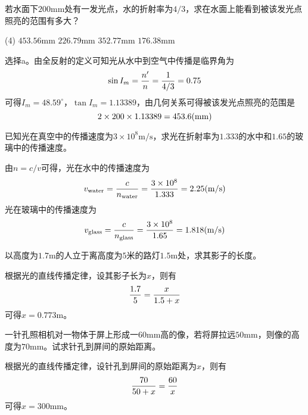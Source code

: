 \documentclass[cn,10pt,chinesefont=founder,math=newtx,cite=super,twoside]{elegantbook}
\begin{document}
\begin{problem}
	若水面下$200\mathrm{mm}$处有一发光点，水的折射率为$4/3$，求在水面上能看到被该发光点照亮的范围有多大？
	\begin{tasks}(4)
		\task $453.56\mathrm{mm}$
		\task $226.79\mathrm{mm}$
		\task $352.77\mathrm{mm}$
		\task $176.38\mathrm{mm}$
	\end{tasks}
\end{problem}
\begin{solution}
	选择a。由全反射的定义可知光从水中到空气中传播是临界角为
	\begin{equation}
	\sin I_m=\frac{n'}{n}=\frac{1}{4/3}=0.75\notag
	\end{equation}
	可得$I_m=48.59^{\circ}$，$\tan I_m=1.13389$，由几何关系可得被该发光点照亮的范围是
	\begin{equation}
	2\times200\times1.13389=453.6(\mathrm{mm})\notag
	\end{equation}
\end{solution}

\begin{problem}
	已知光在真空中的传播速度为$3\times10^8\mathrm{m/s}$，求光在折射率为$1.333$的水中和$1.65$的玻璃中的传播速度。
\end{problem}
\begin{solution}
	由$n=c/v$可得，光在水中的传播速度为
	\begin{equation}
	v_{\mathrm{water}}=\frac{c}{n_{\mathrm{water}}}=\frac{3\times10^8}{1.333}=2.25(\mathrm{m/s})\notag
	\end{equation}
	光在玻璃中的传播速度为
	\begin{equation}
	v_{\mathrm{glass}}=\frac{c}{n_{\mathrm{glass}}}=\frac{3\times10^8}{1.65}=1.818(\mathrm{m/s})\notag
	\end{equation}
\end{solution}

\begin{problem}
	以高度为$1.7\mathrm{m}$的人立于离高度为$5$米的路灯$1.5\mathrm{m}$处，求其影子的长度。
\end{problem}
\begin{solution}
	根据光的直线传播定律，设其影子长为$x$，则有
	\begin{equation}
	\frac{1.7}{5}=\frac{x}{1.5+x}\notag
	\end{equation}
	可得$x=0.773\mathrm{m}$。
\end{solution}

\begin{problem}
	一针孔照相机对一物体于屏上形成一$60\mathrm{mm}$高的像，若将屏拉远$50\mathrm{mm}$，则像的高度为$70\mathrm{mm}$。试求针孔到屏间的原始距离。
\end{problem}
\begin{solution}
	根据光的直线传播定律，设针孔到屏间的原始距离为$x$，则有
	\begin{equation}
	\frac{70}{50+x}=\frac{60}{x}\notag
	\end{equation}
	可得$x=300\mathrm{mm}$。
\end{solution}
\end{document}

